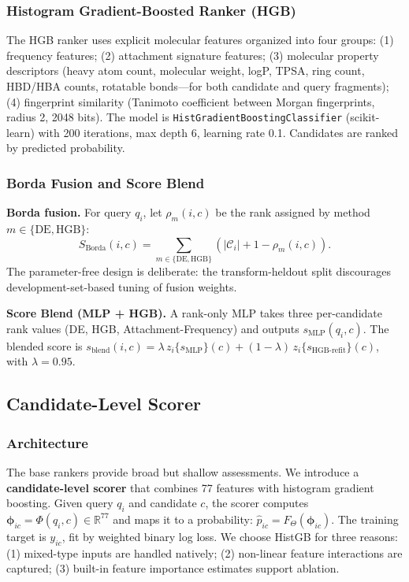 \documentclass[12pt,letterpaper]{article}
\begin{document}
\subsubsection{Histogram Gradient-Boosted Ranker (HGB)}

The HGB ranker uses explicit molecular features organized into four groups: (1) frequency features; (2) attachment signature features; (3) molecular property descriptors (heavy atom count, molecular weight, logP, TPSA, ring count, HBD/HBA counts, rotatable bonds---for both candidate and query fragments); (4) fingerprint similarity (Tanimoto coefficient between Morgan fingerprints, radius 2, 2048 bits). The model is \texttt{HistGradientBoostingClassifier} (scikit-learn) with 200 iterations, max depth 6, learning rate 0.1. Candidates are ranked by predicted probability.

\subsubsection{Borda Fusion and Score Blend}

\textbf{Borda fusion.} For query $q_i$, let $\rho_m(i,c)$ be the rank assigned by method $m\in\{\mathrm{DE},\mathrm{HGB}\}$:
%
\begin{equation}
S_{\mathrm{Borda}}(i,c) = \sum_{m\in\{\mathrm{DE},\mathrm{HGB}\}} \left(|\mathcal{C}_i| + 1 - \rho_m(i,c)\right).
\end{equation}
%
The parameter-free design is deliberate: the transform-heldout split discourages development-set-based tuning of fusion weights.

\textbf{Score Blend (MLP + HGB).} A rank-only MLP takes three per-candidate rank values (DE, HGB, Attachment-Frequency) and outputs $s_{\mathrm{MLP}}(q_i, c)$. The blended score is $s_{\mathrm{blend}}(i,c) = \lambda\, z_i\{s_{\mathrm{MLP}}\}(c) + (1-\lambda)\, z_i\{s_{\mathrm{HGB\text{-}refit}}\}(c)$, with $\lambda=0.95$.

\subsection{Candidate-Level Scorer}

\subsubsection{Architecture}

The base rankers provide broad but shallow assessments. We introduce a \textbf{candidate-level scorer} that combines 77 features with histogram gradient boosting. Given query $q_i$ and candidate $c$, the scorer computes $\boldsymbol{\phi}_{ic} = \Phi(q_i,c) \in \mathbb{R}^{77}$ and maps it to a probability: $\widehat{p}_{ic} = F_{\Theta}(\boldsymbol{\phi}_{ic})$. The training target is $y_{ic}$, fit by weighted binary log loss. We choose HistGB for three reasons: (1) mixed-type inputs are handled natively; (2) non-linear feature interactions are captured; (3) built-in feature importance estimates support ablation.
\end{document}
